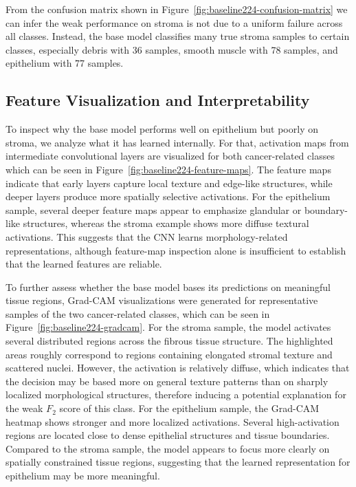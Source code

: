 From the confusion matrix shown in Figure~\ref{fig:baseline224-confusion-matrix}
we can infer the weak performance on stroma is not due to a uniform failure
across all classes. Instead, the base model classifies many true stroma samples
to certain classes, especially debris with 36 samples, smooth muscle with 78
samples, and epithelium with 77 samples.



\subsection{Feature Visualization and Interpretability}
To inspect why the base model performs well on epithelium but poorly on stroma,
we analyze what it has learned internally. For that, activation maps from
intermediate convolutional layers are visualized for both cancer-related
classes which can be seen in Figure~\ref{fig:baseline224-feature-maps}.
The feature maps indicate that early layers capture local texture and edge-like
structures, while deeper layers produce more spatially selective activations.
For the epithelium sample, several deeper feature maps appear to emphasize
glandular or boundary-like structures, whereas the stroma example shows more
diffuse textural activations. This suggests that the CNN learns
morphology-related representations, although feature-map inspection alone is
insufficient to establish that the learned features are reliable.


To further assess whether the base model bases its predictions on meaningful
tissue regions, Grad-CAM visualizations were generated for representative
samples of the two cancer-related classes, which can be seen in
Figure~\ref{fig:baseline224-gradcam}.
For the stroma sample, the model activates several distributed regions across
the fibrous tissue structure. The highlighted areas roughly correspond to
regions containing elongated stromal texture and scattered nuclei. However, the
activation is relatively diffuse, which indicates that the decision may be based
more on general texture patterns than on sharply localized morphological
structures, therefore inducing a potential explanation for the weak $F_2$ score
of this class. For the epithelium sample, the Grad-CAM heatmap shows stronger
and more localized activations. Several high-activation regions are located
close to dense epithelial structures and tissue boundaries. Compared to the
stroma sample, the model appears to focus more clearly on spatially constrained
tissue regions, suggesting that the learned representation for epithelium may be
more meaningful.


